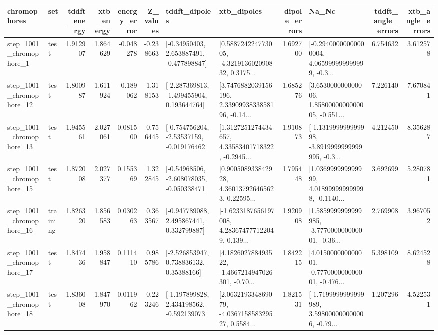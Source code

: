\begin{tabular}{llrrrrllrlrr}
\toprule
             chromophores &       set &  tddft\_energy &  xtb\_energy &  energy\_error &  Z\_values &                               tddft\_dipoles &                                        xtb\_dipoles &  dipole\_errors &                                              Na\_Nc &  tddft\_angle\_errors &  xtb\_angle\_errors \\
\midrule
  step\_1001\_chromophore\_1 &      test &      1.912907 &    1.864629 &     -0.048278 & -0.238663 &    [-0.34950403, 2.653887491, -0.477898847] &  [0.588724224773005, -4.321913602090832, 0.3175... &       1.692700 &  [-0.29400000000000004, 4.065999999999999, -0.3... &            6.754632 &          3.612578 \\
 step\_1001\_chromophore\_12 &      test &      1.800987 &    1.611924 &     -0.189062 & -1.318153 &   [-2.287369813, -1.499455904, 0.193644764] &  [3.7476882039156196, 2.3390993833858196, -0.14... &       1.685276 &  [3.653000000000006, 1.8580000000000005, -0.551... &            7.226140 &          7.670841 \\
 step\_1001\_chromophore\_13 &      test &      1.945561 &    2.027061 &      0.081500 &  0.756445 &   [-0.754756204, -2.53537159, -0.019176462] &  [1.3127251274434657, 4.33583401718322, -0.2945... &       1.910873 &  [-1.131999999999998, -3.8919999999999995, -0.3... &            4.212450 &          8.356287 \\
 step\_1001\_chromophore\_15 &      test &      1.872008 &    2.027377 &      0.155369 &  1.322845 &   [-0.54968506, -2.608078035, -0.050338471] &  [0.900508933842928, 4.360137926465623, 0.22595... &       1.795448 &  [1.036999999999999, 4.018999999999998, -0.1140... &            3.692699 &          5.280781 \\
 step\_1001\_chromophore\_16 &  training &      1.826320 &    1.856583 &      0.030263 &  0.363567 &    [-0.947789088, 2.495867441, 0.332799887] &  [-1.6233187656197008, 4.283674777122049, 0.139... &       1.920908 &  [1.5859999999999985, -3.777000000000001, -0.36... &            2.769908 &          3.967052 \\
 step\_1001\_chromophore\_17 &      test &      1.847436 &    1.958847 &      0.111410 &  0.985786 &     [-2.526853947, 0.738836132, 0.35388166] &  [4.182602788493522, -1.4667214947026301, -0.70... &       1.842215 &  [4.015000000000001, -0.777000000000001, -0.476... &            5.398109 &          8.624528 \\
 step\_1001\_chromophore\_18 &      test &      1.836008 &    1.847970 &      0.011962 &  0.223246 &   [-1.197899828, 2.434198562, -0.592139073] &  [2.063219334869079, -4.036715858329527, 0.5584... &       1.821531 &  [-1.7199999999999989, 3.598000000000006, -0.79... &            1.207296 &          4.522531 \\

\end{tabular}
